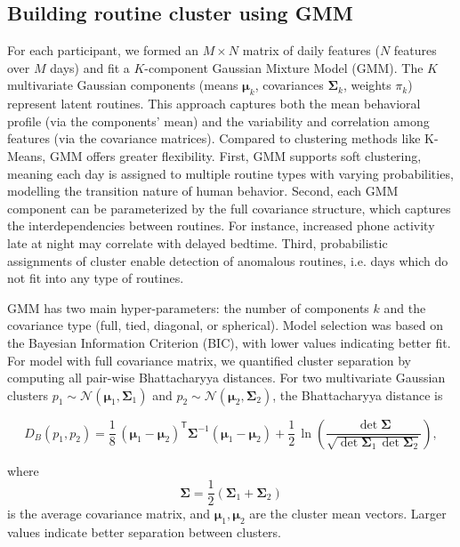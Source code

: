 \documentclass[pdflatex,sn-vancouver,Numbered]{bst/sn-jnl}%
\theoremstyle{thmstyleone}%
\theoremstyle{thmstyletwo}%
\theoremstyle{thmstylethree}%
\begin{document}
\subsection*{Building routine cluster using GMM}\label{sec:methods:building_cluster}

For each participant, we formed an $M \times N$ matrix of daily features ($N$ features over $M$ days) and fit a $K$-component Gaussian Mixture Model (GMM). The $K$ multivariate Gaussian components (means $\boldsymbol{\mu}_k$, covariances $\boldsymbol{\Sigma}_k$, weights $\pi_k$) represent latent routines. This approach captures both the mean behavioral profile (via the components' mean) and the variability and correlation among features (via the covariance matrices).
Compared to clustering methods like K-Means, GMM offers greater flexibility. First, GMM supports soft clustering, meaning each day is assigned to multiple routine types with varying probabilities, modelling the transition nature of human behavior. Second, each GMM component can be parameterized by the full covariance structure, which captures the interdependencies between routines. For instance, increased phone activity late at night may correlate with delayed bedtime. Third, probabilistic assignments of cluster enable detection of anomalous routines, i.e. days which do not fit into any type of routines.

GMM has two main hyper-parameters: the number of components \(k\) and the covariance type (full, tied, diagonal, or spherical). 
Model selection was based on the Bayesian Information Criterion (BIC), with lower values indicating better fit. For model with full covariance matrix, we quantified cluster separation by computing all pair-wise Bhattacharyya distances. 
For two multivariate Gaussian clusters \(p_1 \sim \mathcal{N}(\boldsymbol{\mu}_1, \boldsymbol{\Sigma}_1)\) and \(p_2 \sim \mathcal{N}(\boldsymbol{\mu}_2, \boldsymbol{\Sigma}_2)\), the Bhattacharyya distance is

\[
D_B(p_1,p_2)
    = \frac{1}{8}\,
      (\boldsymbol{\mu}_1 - \boldsymbol{\mu}_2)^{\mathsf T}
      \boldsymbol{\Sigma}^{-1}
      (\boldsymbol{\mu}_1 - \boldsymbol{\mu}_2)
      + \frac{1}{2}\,
        \ln\!\left(
          \frac{\det\boldsymbol{\Sigma}}
               {\sqrt{\det\boldsymbol{\Sigma}_1\,\det\boldsymbol{\Sigma}_2}}
        \right),
\]

where
\[
\boldsymbol{\Sigma} = \frac{1}{2} \left( \boldsymbol{\Sigma}_1 + \boldsymbol{\Sigma}_2 \right)
\]
is the average covariance matrix, and \(\boldsymbol{\mu}_1,\boldsymbol{\mu}_2\) are the cluster mean vectors. Larger values indicate better separation between clusters.
\end{document}
